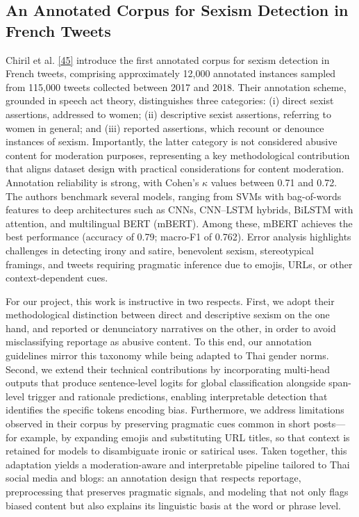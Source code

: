 \documentclass[12pt,oneside,openright,a4paper]{cpe-english-project}
\begin{document}
\subsection{An Annotated Corpus for Sexism Detection in French Tweets}

Chiril et al. \hyperlink{bib:ref45}{[45]} introduce the first annotated corpus for sexism detection in French tweets, comprising approximately 12,000 annotated instances sampled from 115,000 tweets collected between 2017 and 2018. Their annotation scheme, grounded in speech act theory, distinguishes three categories: (i) direct sexist assertions, addressed to women; (ii) descriptive sexist assertions, referring to women in general; and (iii) reported assertions, which recount or denounce instances of sexism. Importantly, the latter category is not considered abusive content for moderation purposes, representing a key methodological contribution that aligns dataset design with practical considerations for content moderation. Annotation reliability is strong, with Cohen's $\kappa$ values between 0.71 and 0.72. The authors benchmark several models, ranging from SVMs with bag-of-words features to deep architectures such as CNNs, CNN--LSTM hybrids, BiLSTM with attention, and multilingual BERT (mBERT). Among these, mBERT achieves the best performance (accuracy of 0.79; macro-F1 of 0.762). Error analysis highlights challenges in detecting irony and satire, benevolent sexism, stereotypical framings, and tweets requiring pragmatic inference due to emojis, URLs, or other context-dependent cues.

For our project, this work is instructive in two respects. First, we adopt their methodological distinction between direct and descriptive sexism on the one hand, and reported or denunciatory narratives on the other, in order to avoid misclassifying reportage as abusive content. To this end, our annotation guidelines mirror this taxonomy while being adapted to Thai gender norms. Second, we extend their technical contributions by incorporating multi-head outputs that produce sentence-level logits for global classification alongside span-level trigger and rationale predictions, enabling interpretable detection that identifies the specific tokens encoding bias. Furthermore, we address limitations observed in their corpus by preserving pragmatic cues common in short posts---for example, by expanding emojis and substituting URL titles, so that context is retained for models to disambiguate ironic or satirical uses. Taken together, this adaptation yields a moderation-aware and interpretable pipeline tailored to Thai social media and blogs: an annotation design that respects reportage, preprocessing that preserves pragmatic signals, and modeling that not only flags biased content but also explains its linguistic basis at the word or phrase level.
\end{document}
